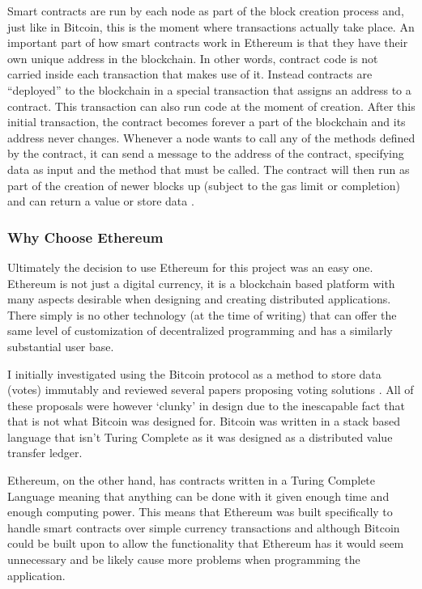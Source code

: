 \documentclass{article}
\begin{document}
Smart contracts are run by each node as part of the block creation process and, just like in Bitcoin, this is the moment where transactions actually take place. An important part of how smart contracts work in Ethereum is that they have their own unique address in the blockchain. In other words, contract code is not carried inside each transaction that makes use of it. Instead contracts are ``deployed'' to the blockchain in a special transaction that assigns an address to a contract. This transaction can also run code at the moment of creation. After this initial transaction, the contract becomes forever a part of the blockchain and its address never changes. Whenever a node wants to call any of the methods defined by the contract, it can send a message to the address of the contract, specifying data as input and the method that must be called. The contract will then run as part of the creation of newer blocks up (subject to the gas limit or completion) and can return a value or store data \citep{59_peyrott_senanayaka_2017}.

\cleardoublepage
\subsubsection{Why Choose Ethereum}
Ultimately the decision to use Ethereum for this project was an easy one. Ethereum is not just a digital currency, it is a blockchain based platform with many aspects desirable when designing and creating distributed applications. There simply is no other technology (at the time of writing) that can offer the same level of customization of decentralized programming and has a similarly substantial user base.

I initially investigated using the Bitcoin protocol as a method to store data (votes) immutably and reviewed several papers proposing voting solutions \citep{60_flint_2017}. All of these proposals were however `clunky' in design due to the inescapable fact that that is not what Bitcoin was designed for. Bitcoin was written in a stack based language that isn't Turing Complete as it was designed as a distributed value transfer ledger. 

Ethereum, on the other hand, has contracts written in a Turing Complete Language meaning that anything can be done with it given enough time and enough computing power. This means that Ethereum was built specifically to handle smart contracts over simple currency transactions and although Bitcoin could be built upon to allow the functionality that Ethereum has it would seem unnecessary and be likely cause more problems when programming the application.
\end{document}
